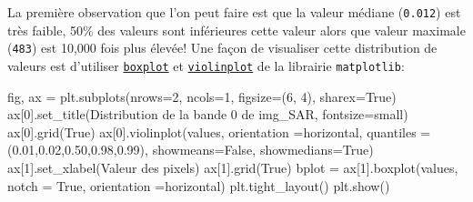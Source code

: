 \documentclass[
  11pt,
  letterpaper,
  open=any,
  twoside=false,
  french]{scrbook}
\newenvironment{Shaded}{\begin{snugshade}}{\end{snugshade}}
\newcommand{\DecValTok}[1]{\textcolor[rgb]{0.68,0.00,0.00}{#1}}
\newcommand{\FloatTok}[1]{\textcolor[rgb]{0.68,0.00,0.00}{#1}}
\newcommand{\NormalTok}[1]{\textcolor[rgb]{0.00,0.23,0.31}{#1}}
\newcommand{\OperatorTok}[1]{\textcolor[rgb]{0.37,0.37,0.37}{#1}}
\newcommand{\StringTok}[1]{\textcolor[rgb]{0.13,0.47,0.30}{#1}}
\newcommand{\VariableTok}[1]{\textcolor[rgb]{0.07,0.07,0.07}{#1}}
\begin{document}
La première observation que l'on peut faire est que la valeur médiane
(\texttt{0.012}) est très faible, 50\% des valeurs sont inférieures
cette valeur alors que valeur maximale (\texttt{483}) est 10,000 fois
plus élevée! Une façon de visualiser cette distribution de valeurs est
d'utiliser
\href{https://matplotlib.org/stable/api/_as_gen/matplotlib.pyplot.boxplot.html}{\texttt{boxplot}}
et
\href{https://matplotlib.org/stable/api/_as_gen/matplotlib.pyplot.violinplot.html}{\texttt{violinplot}}
de la librairie \texttt{matplotlib}:

\begin{Shaded}
\begin{Highlighting}[]
\NormalTok{fig, ax }\OperatorTok{=}\NormalTok{ plt.subplots(nrows}\OperatorTok{=}\DecValTok{2}\NormalTok{, ncols}\OperatorTok{=}\DecValTok{1}\NormalTok{, figsize}\OperatorTok{=}\NormalTok{(}\DecValTok{6}\NormalTok{, }\DecValTok{4}\NormalTok{), sharex}\OperatorTok{=}\VariableTok{True}\NormalTok{)}
\NormalTok{ax[}\DecValTok{0}\NormalTok{].set\_title(}\StringTok{\textquotesingle{}Distribution de la bande 0 de img\_SAR\textquotesingle{}}\NormalTok{, fontsize}\OperatorTok{=}\StringTok{\textquotesingle{}small\textquotesingle{}}\NormalTok{)}
\NormalTok{ax[}\DecValTok{0}\NormalTok{].grid(}\VariableTok{True}\NormalTok{)}
\NormalTok{ax[}\DecValTok{0}\NormalTok{].violinplot(values, orientation  }\OperatorTok{=}\StringTok{\textquotesingle{}horizontal\textquotesingle{}}\NormalTok{, }
\NormalTok{                 quantiles }\OperatorTok{=}\NormalTok{(}\FloatTok{0.01}\NormalTok{,}\FloatTok{0.02}\NormalTok{,}\FloatTok{0.50}\NormalTok{,}\FloatTok{0.98}\NormalTok{,}\FloatTok{0.99}\NormalTok{),}
\NormalTok{                  showmeans}\OperatorTok{=}\VariableTok{False}\NormalTok{,}
\NormalTok{                  showmedians}\OperatorTok{=}\VariableTok{True}\NormalTok{)}
\NormalTok{ax[}\DecValTok{1}\NormalTok{].set\_xlabel(}\StringTok{\textquotesingle{}Valeur des pixels\textquotesingle{}}\NormalTok{)}
\NormalTok{ax[}\DecValTok{1}\NormalTok{].grid(}\VariableTok{True}\NormalTok{)}
\NormalTok{bplot }\OperatorTok{=}\NormalTok{ ax[}\DecValTok{1}\NormalTok{].boxplot(values, notch }\OperatorTok{=} \VariableTok{True}\NormalTok{, orientation  }\OperatorTok{=}\StringTok{\textquotesingle{}horizontal\textquotesingle{}}\NormalTok{)}
\NormalTok{plt.tight\_layout()}
\NormalTok{plt.show()}
\end{Highlighting}
\end{Shaded}
\end{document}
